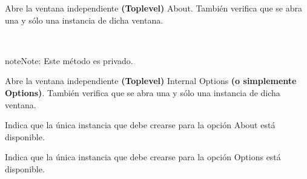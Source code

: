 \documentclass[letterpaper,10pt,english]{sphinxmanual}
\begin{document}
\begin{fulllineitems}
\begin{fulllineitems}
Abre la ventana independiente \textbf{(Toplevel)} About.
También verifica que se abra una y sólo una instancia de 
dicha ventana.

\end{fulllineitems}


\begin{fulllineitems}
\label{View/Additional/MenuInternalOption/MenuInternalOption:View.Additional.MenuInternalOption.MenuInternalOption.MenuInternalOption._MenuInternalOption__launch_internal_option_toplevel}~
\begin{notice}{note}{Note:}
Este método es privado.
\end{notice}

Abre la ventana independiente \textbf{(Toplevel)} Internal Options
\textbf{(o simplemente Options)}.
También verifica que se abra una y sólo una instancia de 
dicha ventana.

\end{fulllineitems}


\begin{fulllineitems}
\label{View/Additional/MenuInternalOption/MenuInternalOption:View.Additional.MenuInternalOption.MenuInternalOption.MenuInternalOption.about_toplevel_custom_close}
Indica que la única instancia que debe crearse
para la opción About está disponible.

\end{fulllineitems}


\begin{fulllineitems}
\label{View/Additional/MenuInternalOption/MenuInternalOption:View.Additional.MenuInternalOption.MenuInternalOption.MenuInternalOption.internal_option_toplevel_custom_close}
Indica que la única instancia que debe crearse
para la opción Options está disponible.

\end{fulllineitems}


\end{fulllineitems}
\end{document}
